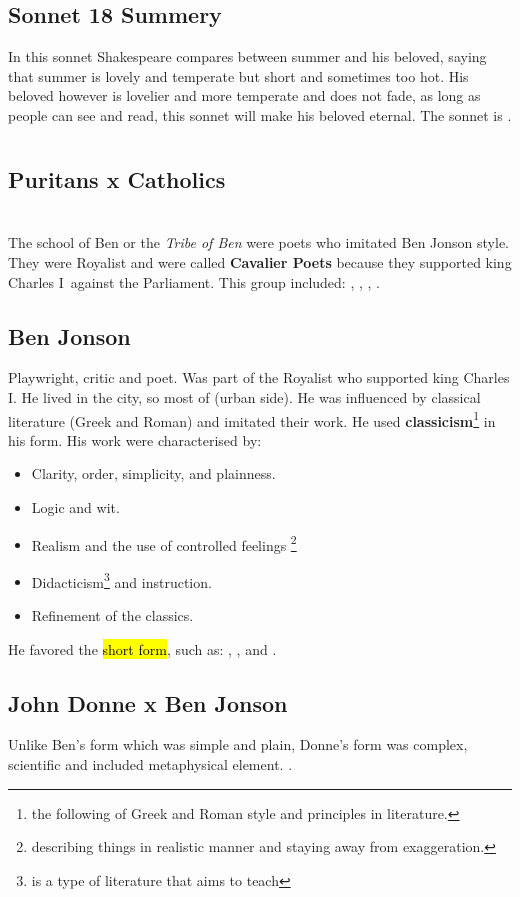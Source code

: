 \documentclass[12pt, a4paper]{article}
\begin{document}
\subsection*{Sonnet 18 Summery}
{\fontpar
In this sonnet Shakespeare compares between summer and his beloved, saying that summer is lovely and temperate
but short and sometimes too hot. His beloved however is 
lovelier and more temperate and does not fade, as long as 
people can see and read, this sonnet will make his beloved eternal. The 
sonnet is .
}

\section*{}
{\fontpar
\subsection*{Puritans x Catholics}

\section*{}

The school of Ben or the \textit{Tribe of Ben} were poets who imitated
Ben Jonson style. They were Royalist and were called \textbf{Cavalier Poets} because they
supported king Charles I\, against the Parliament. This group included: 
, , 
, .

\subsection*{Ben Jonson}

Playwright, critic and poet. Was part of the Royalist who supported 
king Charles I. He lived in the city, 
so most of  (urban side). He was influenced by classical 
literature (Greek and Roman) and imitated their work. He used
\textbf{classicism}\footnote{the following of Greek and Roman style and 
principles in literature.} 
in his form. His work were characterised by:

\begin{itemize}
  \item Clarity, order, simplicity, and plainness.
  \item Logic and wit.
  \item Realism and the use of controlled feelings
    \footnote{describing things in realistic  manner and staying away 
    from exaggeration.}
  \item Didacticism\footnote{is a type of literature that aims to teach}
    and instruction.
  \item Refinement of the classics. 
\end{itemize}
He favored the \hl{short form}, such as: 
, ,  and 
.

\subsection*{John Donne x Ben Jonson}

Unlike Ben's form which was simple and plain, Donne's form was complex, 
scientific and included metaphysical element. .
}
\end{document}
